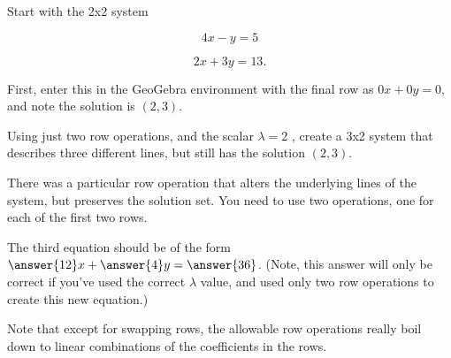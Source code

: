 \documentclass{ximera}
\begin{document}
\begin{exploration}
    
    
    
    
    \begin{example}
    
        Start with the 2x2 system 
    
        $$4x-y=5$$
    
        $$2x+3y=13.$$
    
        First, enter this in the GeoGebra environment with the final row as $0x+0y=0$, and note the solution is $(2,3)$.
    
        Using just two row operations, and the scalar %
        $\lambda=2$
        , create a 3x2 system that describes three different lines, but still has the solution $(2,3)$.
    
        \begin{hint}
    
            There was a particular row operation that alters the underlying lines of the system, but preserves the solution set. You need to use two operations, one for each of the first two rows.
    
        \end{hint}
    
        The third equation should be of the form $\answer{12}x+\answer{4}y=\answer{36}$.
        (Note, this answer will only be correct if you've used the correct $\lambda$ value, and used only two row operations to create this new equation.)
    
    
    \end{example}
    
    \begin{remark}
    
        Note that except for swapping rows, the allowable row operations really boil down to linear combinations of the coefficients in the rows.
    

\end{remark}
\end{exploration}
\end{document}
